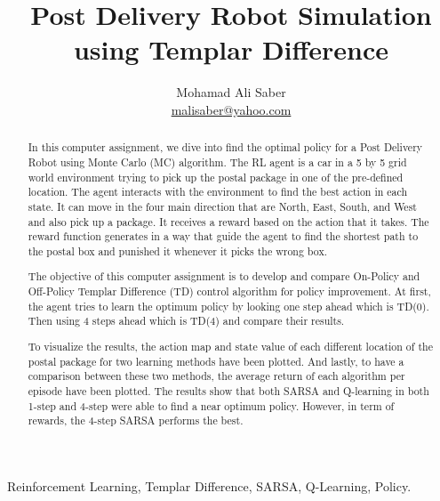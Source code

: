 \documentclass[lettersize,journal]{IEEEtran}
\begin{document}
\title{Post Delivery Robot Simulation using Templar Difference}

\author{Mohamad Ali Saber \\ \href{mailto:malisaber@yahoo.com}{malisaber@yahoo.com}}
\maketitle

\begin{abstract}
In this computer assignment, we dive into find the optimal policy for a Post Delivery Robot using Monte Carlo (MC) algorithm. The RL agent is a car in a 5 by 5 grid world environment trying to pick up the postal package in one of the pre-defined location. The agent interacts with the environment to find the best action in each state. It can move in the four main direction that are North, East, South, and West and also pick up a package. It receives a reward based on the action that it takes. The reward function generates in a way that guide the agent to find the shortest path to the postal box and punished it whenever it picks the wrong box.\par

The objective of this computer assignment is to develop and compare On-Policy and Off-Policy Templar Difference (TD) control algorithm for policy improvement. At first, the agent tries to learn the optimum policy by looking one step ahead which is TD(0). Then using 4 steps ahead which is TD(4) and compare their results.\par

To visualize the results, the action map and state value of each different location of the postal package for two learning methods have been plotted. And lastly, to have a comparison between these two methods, the average return of each algorithm per episode have been plotted. The results show that both SARSA and Q-learning in both 1-step and 4-step were able to find a near optimum policy. However, in term of rewards, the 4-step SARSA performs the best.
\end{abstract}

\begin{IEEEkeywords}
Reinforcement Learning, Templar Difference, SARSA, Q-Learning, Policy.
\end{IEEEkeywords}




\end{document}

